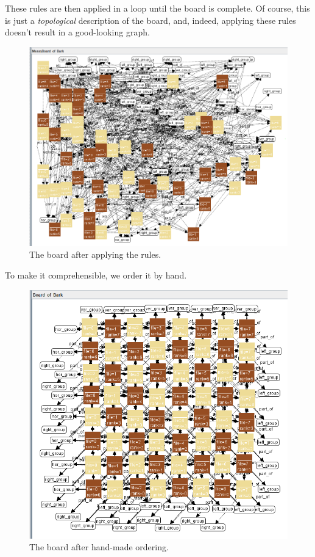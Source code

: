 \documentclass[a4paper]{scrartcl}
\begin{document}
    These rules are then applied in a loop until the board is complete.
    Of course, this is just a \emph{topological} description of the board, and, indeed, applying these rules doesn't result in a good-looking graph.
    \begin{figure}[H]
        \centering
        \includegraphics[width=.5\linewidth]{images/messy_board.png}
        \caption{The board after applying the rules.}
    \end{figure}
    To make it comprehensible, we order it by hand.
    \begin{figure}[H]
        \centering
        \includegraphics[width=.8\linewidth]{images/board.png}
        \caption{The board after hand-made ordering.}
    \end{figure}
\end{document}

